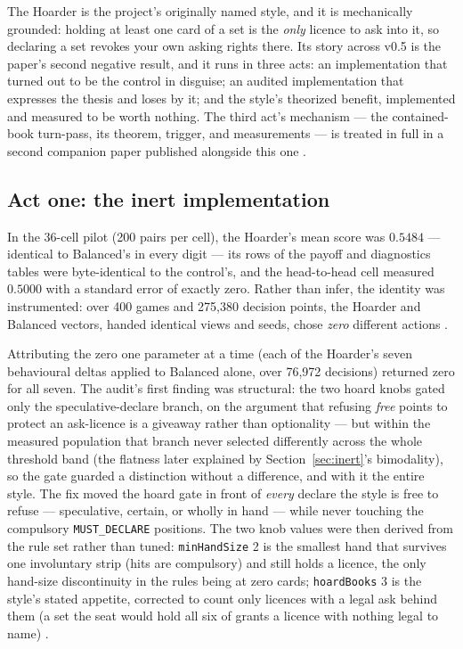 \documentclass[11pt]{article}
\newcommand{\code}[1]{\texttt{#1}}
\begin{document}
The Hoarder is the project's originally named style, and it is mechanically grounded: holding
at least one card of a set is the \emph{only} licence to ask into it, so declaring a set
revokes your own asking rights there. Its story across v0.5 is the paper's second negative
result, and it runs in three acts: an implementation that turned out to be the control in
disguise; an audited implementation that expresses the thesis and loses by it; and the
style's theorized benefit, implemented and measured to be worth nothing. The third act's
mechanism --- the contained-book turn-pass, its theorem, trigger, and measurements --- is
treated in full in a second companion paper published alongside this one \cite{containedpaper}.

\subsection{Act one: the inert implementation}
\label{sec:hoarderaudit}

In the 36-cell pilot (200 pairs per cell), the Hoarder's mean score was $0.5484$ --- identical
to Balanced's in every digit --- its rows of the payoff and diagnostics tables were
byte-identical to the control's, and the head-to-head cell measured $0.5000$ with a standard
error of exactly zero. Rather than infer, the identity was instrumented: over 400 games and
275{,}380 decision points, the Hoarder and Balanced vectors, handed identical views and seeds,
chose \emph{zero} different actions \cite{styles}.

Attributing the zero one parameter at a time (each of the Hoarder's seven behavioural deltas
applied to Balanced alone, over 76{,}972 decisions) returned zero for all seven. The audit's
first finding was structural: the two hoard knobs gated only the speculative-declare branch,
on the argument that refusing \emph{free} points to protect an ask-licence is a giveaway
rather than optionality --- but within the measured population that branch never selected
differently across the whole threshold band (the flatness later explained by
Section~\ref{sec:inert}'s bimodality), so the gate guarded a distinction without a
difference, and with it the entire style. The fix moved the hoard gate in front of
\emph{every} declare the style is free to refuse --- speculative, certain, or wholly in hand
--- while never touching the compulsory \code{MUST\_DECLARE} positions. The two knob values
were then derived from the rule set rather than tuned: \code{minHandSize} 2 is the smallest
hand that survives one involuntary strip (hits are compulsory) and still holds a licence,
the only hand-size discontinuity in the rules being at zero cards; \code{hoardBooks} 3 is the
style's stated appetite, corrected to count only licences with a legal ask behind them
(a set the seat would hold all six of grants a licence with nothing legal to name)
\cite{styles}.
\end{document}
